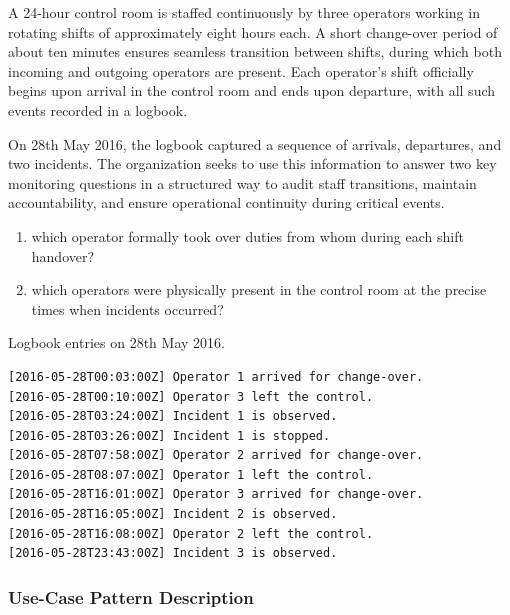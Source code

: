A 24-hour control room is staffed continuously by three operators working in rotating shifts of approximately eight hours each. A short change-over period of about ten minutes ensures seamless transition between shifts, during which both incoming and outgoing operators are present. Each operator’s shift officially begins upon arrival in the control room and ends upon departure, with all such events recorded in a logbook.

On 28th May 2016, the logbook captured a sequence of arrivals, departures, and two incidents. The organization seeks to use this information to answer two key monitoring questions in a structured way to audit staff transitions, maintain accountability, and ensure operational continuity during critical events. 
\begin{enumerate}
    \item which operator formally took over duties from whom during each shift handover?
    \item which operators were physically present in the control room at the precise times when incidents occurred?
\end{enumerate}

Logbook entries on 28th May 2016.

\begin{verbatim}
[2016-05-28T00:03:00Z] Operator 1 arrived for change-over. 
[2016-05-28T00:10:00Z] Operator 3 left the control.
[2016-05-28T03:24:00Z] Incident 1 is observed.
[2016-05-28T03:26:00Z] Incident 1 is stopped.
[2016-05-28T07:58:00Z] Operator 2 arrived for change-over.
[2016-05-28T08:07:00Z] Operator 1 left the control.
[2016-05-28T16:01:00Z] Operator 3 arrived for change-over.
[2016-05-28T16:05:00Z] Incident 2 is observed.
[2016-05-28T16:08:00Z] Operator 2 left the control.
[2016-05-28T23:43:00Z] Incident 3 is observed.
\end{verbatim}

\subsubsection*{Use-Case Pattern Description}

